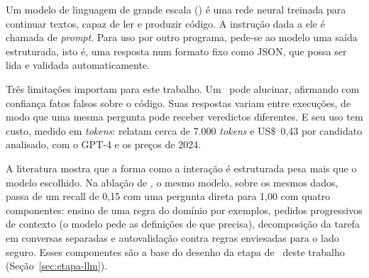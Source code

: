 
Um modelo de linguagem de grande escala (\llm) é uma rede neural treinada para
continuar textos, capaz de ler e produzir código. A instrução dada a ele é
chamada de \textit{prompt}. Para uso por outro programa, pede-se ao modelo uma
saída estruturada, isto é, uma resposta num formato fixo como JSON,
que possa ser lida e validada automaticamente.

Três limitações importam para este trabalho. Um \llm\ pode alucinar,
afirmando com confiança fatos falsos sobre o código. Suas respostas
variam entre execuções, de modo que uma mesma pergunta pode receber
veredictos diferentes. E seu uso tem custo, medido em
\textit{tokens}:  relatam cerca de 7.000 \textit{tokens}
e US\$~0,43 por candidato analisado, com o GPT-4 e os preços de 2024.

A literatura mostra que a forma como a interação é estruturada pesa mais que o
modelo escolhido. Na ablação de , o mesmo modelo, sobre os
mesmos dados, passa de um recall de 0,15 com uma pergunta direta para 1,00 com
quatro componentes: ensino de uma regra do domínio por exemplos, pedidos
progressivos de contexto (o modelo pede as definições de que precisa),
decomposição da tarefa em conversas separadas e autovalidação contra regras
enviesadas para o lado seguro. Esses componentes são a base do desenho da
etapa de \llm\ deste trabalho (Seção~\ref{sec:etapa-llm}).
